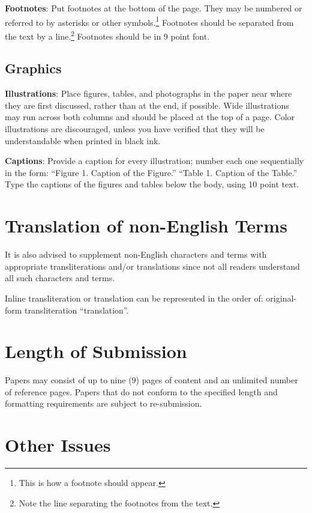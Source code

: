 \documentclass[11pt]{article}
\begin{document}
{\bf Footnotes}: Put footnotes at the bottom of the page. They may
be numbered or referred to by asterisks or other
symbols.\footnote{This is how a footnote should appear.} Footnotes
should be separated from the text by a line.\footnote{Note the
line separating the footnotes from the text.}  Footnotes should be in 9 point font.

\subsection{Graphics}

{\bf Illustrations}: Place figures, tables, and photographs in the
paper near where they are first discussed, rather than at the end, if
possible.  Wide illustrations may run across both columns and should be placed at
the top of a page. Color illustrations are discouraged, unless you have verified that
they will be understandable when printed in black ink.

{\bf Captions}: Provide a caption for every illustration; number each one
sequentially in the form:  ``Figure 1. Caption of the Figure.'' ``Table 1.
Caption of the Table.''  Type the captions of the figures and
tables below the body, using 10 point text.

\section{Translation of non-English Terms}

It is also advised to supplement non-English characters and terms
with appropriate transliterations and/or translations
since not all readers understand all such characters and terms.

Inline transliteration or translation can be represented in
the order of: original-form transliteration ``translation''.

\section{Length of Submission}
\label{sec:length}

Papers may consist of up to nine (9) pages of content and an unlimited number of reference pages. 
Papers that do not conform to the specified length and formatting requirements are subject to re-submission.

\section{Other Issues}
 
\end{document}
